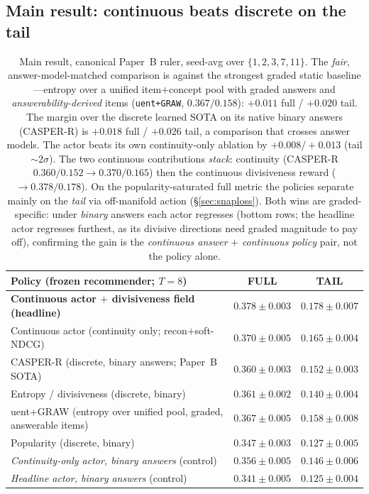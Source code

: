 \documentclass[11pt]{article}
\begin{document}
\subsection{Main result: continuous beats discrete on the tail}\label{sec:main}
\begin{table}[t]\centering
\begin{tabular}{lcc}
\toprule
Policy (frozen recommender; $T{=}8$) & FULL & TAIL \\
\midrule
\textbf{Continuous actor $+$ divisiveness field (headline)} & $\mathbf{0.378\pm0.003}$ & $\mathbf{0.178\pm0.007}$ \\
Continuous actor (continuity only; recon$+$soft-NDCG) & $0.370\pm0.005$ & $0.165\pm0.004$ \\
CASPER-R (discrete, binary answers; Paper~B SOTA) & $0.360\pm0.003$ & $0.152\pm0.003$ \\
Entropy / divisiveness (discrete, binary) & $0.361\pm0.002$ & $0.140\pm0.004$ \\
uent+GRAW (entropy over unified pool, graded, answerable items) & $0.367\pm0.005$ & $0.158\pm0.008$ \\
Popularity (discrete, binary) & $0.347\pm0.003$ & $0.127\pm0.005$ \\
\midrule
\emph{Continuity-only actor, binary answers} (control) & $0.356\pm0.005$ & $0.146\pm0.006$ \\
\emph{Headline actor, binary answers} (control) & $0.341\pm0.005$ & $0.125\pm0.004$ \\
\bottomrule
\end{tabular}
\caption{Main result, canonical Paper~B ruler, seed-avg over $\{1,2,3,7,11\}$. The \emph{fair}, answer-model-matched
comparison is against the strongest graded static baseline---entropy over a unified item$+$concept pool with graded
answers and \emph{answerability-derived} items (\texttt{uent+GRAW}, $0.367/0.158$): $+0.011$ full / $+0.020$ tail. The
margin over the discrete learned SOTA on its native binary answers (CASPER-R) is $+0.018$ full / $+0.026$ tail, a
comparison that crosses answer models. The actor beats its own
continuity-only ablation by $+0.008/+0.013$ (tail ${\sim}2\sigma$). The two continuous contributions \emph{stack}:
continuity (CASPER-R $0.360/0.152\!\to\!0.370/0.165$) then the continuous divisiveness reward
($\to\!0.378/0.178$). On the popularity-saturated full metric the policies separate mainly on the \emph{tail} via
off-manifold action (\S\ref{sec:snaploss}). Both wins are graded-specific: under \emph{binary} answers each actor regresses (bottom rows;
the headline actor regresses furthest, as its divisive directions need graded magnitude to pay off), confirming the gain
is the \emph{continuous answer} $+$ \emph{continuous policy} pair, not the policy alone.}\label{tab:main}
\end{table}
\end{document}
